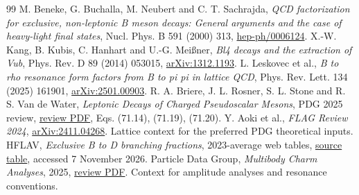 \documentclass[11pt,a4paper]{article}
\begin{document}
\begin{thebibliography}{99}
 M. Beneke, G. Buchalla, M. Neubert and C. T. Sachrajda, \emph{QCD factorization for exclusive, non-leptonic B meson decays: General arguments and the case of heavy-light final states}, Nucl. Phys. B 591 (2000) 313, \href{https://arxiv.org/abs/hep-ph/0006124}{hep-ph/0006124}.
 X.-W. Kang, B. Kubis, C. Hanhart and U.-G. Mei\ss ner, \emph{Bl4 decays and the extraction of Vub}, Phys. Rev. D 89 (2014) 053015, \href{https://arxiv.org/abs/1312.1193}{arXiv:1312.1193}.
 L. Leskovec et al., \emph{B to rho resonance form factors from B to pi pi in lattice QCD}, Phys. Rev. Lett. 134 (2025) 161901, \href{https://arxiv.org/abs/2501.00903}{arXiv:2501.00903}.
 R. A. Briere, J. L. Rosner, S. L. Stone and R. S. Van de Water, \emph{Leptonic Decays of Charged Pseudoscalar Mesons}, PDG 2025 review, \href{https://pdg.lbl.gov/2025/reviews/rpp2025-rev-pseudoscalar-meson-decay-cons.pdf}{review PDF}, Eqs. (71.14), (71.19), (71.20).
 Y. Aoki et al., \emph{FLAG Review 2024}, \href{https://arxiv.org/abs/2411.04268}{arXiv:2411.04268}. Lattice context for the preferred PDG theoretical inputs.
 HFLAV, \emph{Exclusive B to D branching fractions}, 2023-average web tables, \href{https://hflav-eos.web.cern.ch/hflav-eos/semi/writeup23/html/ExclusiveVcb/exclBtoD.html}{source table}, accessed 7 November 2026.
 Particle Data Group, \emph{Multibody Charm Analyses}, 2025, \href{https://pdg.lbl.gov/2025/reviews/rpp2025-rev-d-meson-dalitz-plot-analyses.pdf}{review PDF}. Context for amplitude analyses and resonance conventions.
\end{thebibliography}
\end{document}
